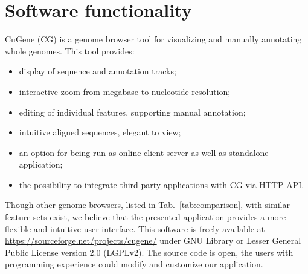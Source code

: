 \documentclass[a4paper]{spie}
\newcommand{\appName}{CuGene}
\newcommand{\appShortcut}{CG}
\begin{document}
\section{Software functionality}

\appName{} (\appShortcut) is a genome browser tool for visualizing and manually annotating whole genomes.
This tool provides:
\begin{itemize}
\itemsep0em
\item display of sequence and annotation tracks;
\item interactive zoom from megabase to nucleotide resolution;
\item editing of individual features, supporting manual annotation;
\item intuitive aligned sequences, elegant to view;
\item an option for being run as online client-server as well as standalone application;
\item the possibility to integrate third party applications with \appShortcut{} via HTTP API.
\end{itemize}

Though other genome browsers, listed in Tab.~\ref{tab:comparison}, with similar feature sets exist,
we believe that the presented application provides a more flexible and intuitive user interface.
This software is freely available at \url{https://sourceforge.net/projects/cugene/} under GNU Library or Lesser General Public License version 2.0 (LGPLv2).
The source code is open, the users with programming experience could modify and customize our application.
\end{document}
